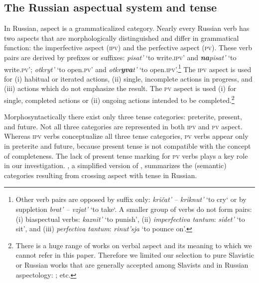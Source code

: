 \documentclass[output=paper,
colorlinks,
citecolor=brown,
newtxmath,
hidelinks
]{langscibook}
\begin{document}
\subsection{The Russian aspectual system and tense} \label{sub:eins:2}

In Russian, aspect is a grammaticalized category. Nearly every Russian verb has two aspects that are morphologically distinguished and differ in grammatical function: the imperfective aspect (\textsc{ipv}) and the perfective aspect (\textsc{pv}). These verb pairs are derived by prefixes or suffixes: \textit{pisat'} ‘to write\textsc{.ipv}’ and \textit{\textbf{na}pisat'} ‘to write\textsc{.pv}’; \textit{otkryt'} ‘to open\textsc{.pv}’ and \textit{otkr\textbf{yva}t'} ‘to open\textsc{.ipv}’.\footnote{Other verb pairs are opposed by suffix only: \textit{kričat' -- kriknut'} ‘to cry‘ or by suppletion \textit{brat' -- vzjat'} ‘to take‘. A smaller group of verbs do not form pairs: (i) biaspectual verbs: \textit{kaznit'} ‘to punish’, (ii) \textit{imperfectiva tantum}: \textit{sidet'} ‘to sit’, and (iii) \textit{perfectiva tantum}: \textit{rinut'sja} ‘to pounce on’.} The \textsc{ipv} aspect is used for (i) habitual or iterated actions, (ii) single, incomplete actions in progress, and (iii) actions which do not emphasize the result. The \textsc{pv} aspect is used (i) for  single, completed actions or (ii) ongoing actions intended to be completed.\footnote{There is a huge range of works on verbal aspect and its meaning to which we cannot refer in this paper. Therefore we limited our selection to pure Slavistic or Russian works that are generally accepted among Slavists and in Russian aspectology: \citet{Anstatt2003,Avilova1976,Bondarko1971,Breu1980,Breu2000ProblemederInteraktion,Comrie1976,Dickey2000,Galton1976,Klein1995,Lehmann1999,Maslov1984,Mehlig1980,Paduceva1996,Petruchina2000,Rassudova1968,Zaliznjak2000}; etc.}

Morphosyntactically there exist only  three tense categories: preterite, present, and future. Not all three categories are represented in both \textsc{ipv} and \textsc{pv} aspect. Whereas \textsc{ipv} verbs conceptualize all three tense categories, \textsc{pv} verbs appear only in preterite and future, because present tense is not compatible with the concept of completeness. The lack of present tense marking for \textsc{pv} verbs plays a key role in our investigation. , a simplified version of \citet{Swan1978}, summarizes the (semantic) categories resulting from crossing aspect with tense in Russian.
\end{document}

